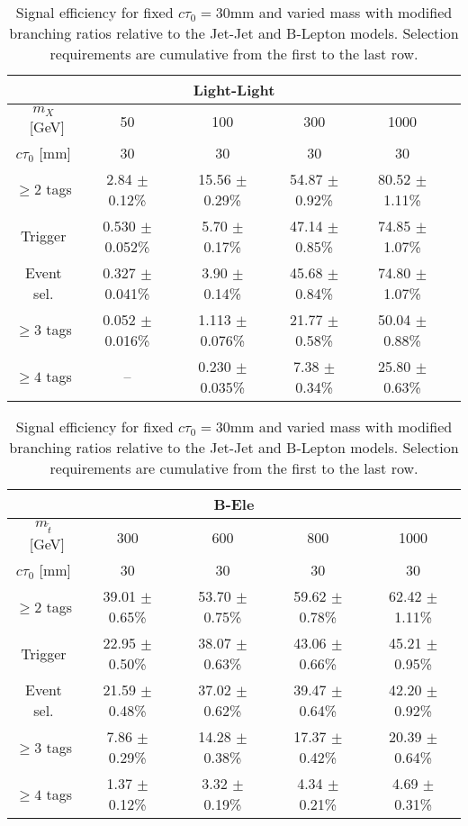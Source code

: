 \begin{table}[tb]
  \caption{ Signal efficiency for fixed  $c\tau_0=30$mm and
   varied mass with modified branching ratios relative 
   to the Jet-Jet and B-Lepton models. Selection requirements are cumulative from
    the first to the last row.\label{tab:cutflow_BR_mass}}
\begin{center}
\begin{tabular}{cccccc} 
\multicolumn{6}{c}{\textbf{Light-Light}} \\
 \hline 
 $m_{X}$~[GeV] & 50 & 100 & 300 & 1000  \\ 
 $c\tau_0$ [mm] & 30 & 30 & 30 & 30 &  \\ 
 \hline 
 $\geq 2$ tags &        2.84 $\pm$ 0.12\% &     15.56 $\pm$ 0.29\% &    54.87 $\pm$ 0.92\% &    80.52 $\pm$ 1.11\%     \\ 
 Trigger &     0.530 $\pm$ 0.052\% &      5.70 $\pm$ 0.17\% &      47.14 $\pm$ 0.85\% &    74.85 $\pm$ 1.07\%\\ 
 Event sel. &   0.327 $\pm$ 0.041\% &     3.90 $\pm$ 0.14\% &       45.68 $\pm$ 0.84\% &    74.80 $\pm$ 1.07\%\\ 
 $\geq 3$ tags &     0.052 $\pm$ 0.016\% &     1.113 $\pm$ 0.076\% &     21.77 $\pm$ 0.58\% &    50.04 $\pm$ 0.88\%\\ 
 $\geq 4$ tags &     -- &  0.230 $\pm$ 0.035\% &     7.38 $\pm$ 0.34\% &       25.80 $\pm$ 0.63\% &    \\ 
\end{tabular}

\begin{tabular}{ccccc} 
\multicolumn{5}{c}{\textbf{B-Ele}} \\
 \hline 
 $m_{\tilde{t}}$~[GeV] & 300 & 600 & 800 & 1000 \\ 
 $c\tau_0$ [mm] & 30 & 30 & 30 & 30 \\ 
\hline 
        $\geq 2$ tags &  39.01 $\pm$ 0.65\% &    53.70 $\pm$ 0.75\% &    59.62 $\pm$ 0.78\% &    62.42 $\pm$ 1.11\% \\ 
         Trigger &     22.95 $\pm$ 0.50\% &  38.07 $\pm$ 0.63\% &    43.06 $\pm$ 0.66\% &    45.21 $\pm$ 0.95\% \\ 
          Event sel. &   21.59 $\pm$ 0.48\% &  37.02 $\pm$ 0.62\% &    39.47 $\pm$ 0.64\% &    42.20 $\pm$ 0.92\% \\ 
           $\geq 3$ tags &     7.86 $\pm$ 0.29\% &   14.28 $\pm$ 0.38\% &    17.37 $\pm$ 0.42\% &    20.39 $\pm$ 0.64\% \\ 
            $\geq 4$ tags &     1.37 $\pm$ 0.12\% &   3.32 $\pm$ 0.19\% &     4.34 $\pm$ 0.21\% &     4.69 $\pm$ 0.31\% \\ 
\end{tabular}


\end{center}
\end{table}

